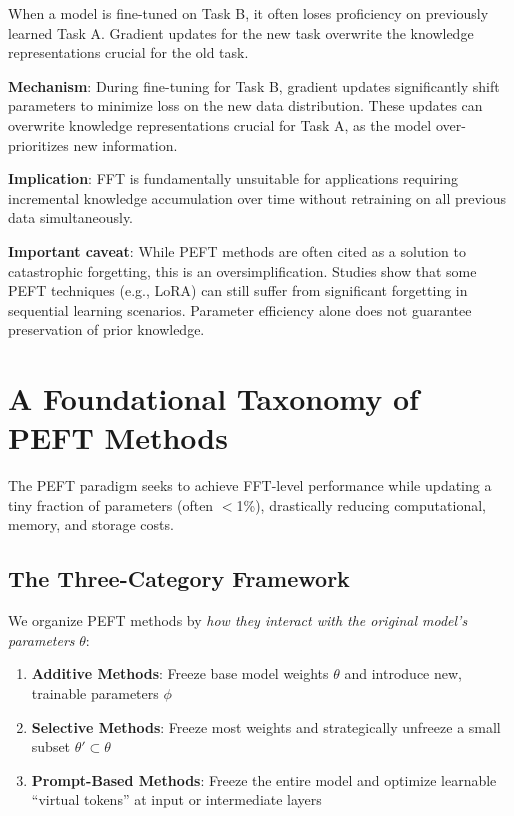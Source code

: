 \documentclass{article}
\begin{document}
\begin{tcolorbox}[colback=red!5!white, colframe=red!75!black, title=Catastrophic Forgetting]
When a model is fine-tuned on Task B, it often loses proficiency on previously learned Task A. Gradient updates for the new task overwrite the knowledge representations crucial for the old task.
\end{tcolorbox}

\textbf{Mechanism}: During fine-tuning for Task B, gradient updates significantly shift parameters to minimize loss on the new data distribution. These updates can overwrite knowledge representations crucial for Task A, as the model over-prioritizes new information.

\textbf{Implication}: FFT is fundamentally unsuitable for applications requiring incremental knowledge accumulation over time without retraining on all previous data simultaneously.

\textbf{Important caveat}: While PEFT methods are often cited as a solution to catastrophic forgetting, this is an oversimplification. Studies show that some PEFT techniques (e.g., LoRA) can still suffer from significant forgetting in sequential learning scenarios. Parameter efficiency alone does not guarantee preservation of prior knowledge.

\section{A Foundational Taxonomy of PEFT Methods}

The PEFT paradigm seeks to achieve FFT-level performance while updating a tiny fraction of parameters (often $<$1\%), drastically reducing computational, memory, and storage costs.

\subsection{The Three-Category Framework}

We organize PEFT methods by \textit{how they interact with the original model's parameters} $\theta$:

\begin{center}
\end{center}

\begin{enumerate}
\item \textbf{Additive Methods}: Freeze base model weights $\theta$ and introduce new, trainable parameters $\phi$
\item \textbf{Selective Methods}: Freeze most weights and strategically unfreeze a small subset $\theta' \subset \theta$
\item \textbf{Prompt-Based Methods}: Freeze the entire model and optimize learnable ``virtual tokens'' at input or intermediate layers
\end{enumerate}
\end{document}
